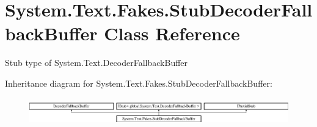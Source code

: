 \hypertarget{class_system_1_1_text_1_1_fakes_1_1_stub_decoder_fallback_buffer}{\section{System.\-Text.\-Fakes.\-Stub\-Decoder\-Fallback\-Buffer Class Reference}
\label{class_system_1_1_text_1_1_fakes_1_1_stub_decoder_fallback_buffer}
}


Stub type of System.\-Text.\-Decoder\-Fallback\-Buffer 


Inheritance diagram for System.\-Text.\-Fakes.\-Stub\-Decoder\-Fallback\-Buffer\-:\begin{figure}[H]
\begin{center}
\leavevmode
\includegraphics[height=1.192758cm]{class_system_1_1_text_1_1_fakes_1_1_stub_decoder_fallback_buffer}
\end{center}
\end{figure}
